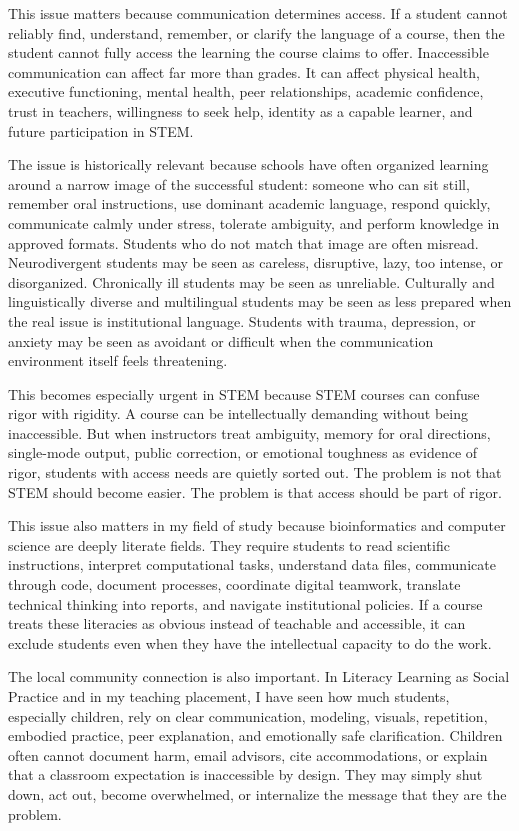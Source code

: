 \documentclass[12pt]{article}
\begin{document}
This issue matters because communication determines access. If a student cannot reliably find, understand, remember, or clarify the language of a course, then the student cannot fully access the learning the course claims to offer. Inaccessible communication can affect far more than grades. It can affect physical health, executive functioning, mental health, peer relationships, academic confidence, trust in teachers, willingness to seek help, identity as a capable learner, and future participation in STEM.

The issue is historically relevant because schools have often organized learning around a narrow image of the successful student: someone who can sit still, remember oral instructions, use dominant academic language, respond quickly, communicate calmly under stress, tolerate ambiguity, and perform knowledge in approved formats. Students who do not match that image are often misread. Neurodivergent students may be seen as careless, disruptive, lazy, too intense, or disorganized. Chronically ill students may be seen as unreliable. Culturally and linguistically diverse and multilingual students may be seen as less prepared when the real issue is institutional language. Students with trauma, depression, or anxiety may be seen as avoidant or difficult when the communication environment itself feels threatening.

This becomes especially urgent in STEM because STEM courses can confuse rigor with rigidity. A course can be intellectually demanding without being inaccessible. But when instructors treat ambiguity, memory for oral directions, single-mode output, public correction, or emotional toughness as evidence of rigor, students with access needs are quietly sorted out. The problem is not that STEM should become easier. The problem is that access should be part of rigor.

This issue also matters in my field of study because bioinformatics and computer science are deeply literate fields. They require students to read scientific instructions, interpret computational tasks, understand data files, communicate through code, document processes, coordinate digital teamwork, translate technical thinking into reports, and navigate institutional policies. If a course treats these literacies as obvious instead of teachable and accessible, it can exclude students even when they have the intellectual capacity to do the work.

The local community connection is also important. In Literacy Learning as Social Practice and in my teaching placement, I have seen how much students, especially children, rely on clear communication, modeling, visuals, repetition, embodied practice, peer explanation, and emotionally safe clarification. Children often cannot document harm, email advisors, cite accommodations, or explain that a classroom expectation is inaccessible by design. They may simply shut down, act out, become overwhelmed, or internalize the message that they are the problem.
\end{document}
